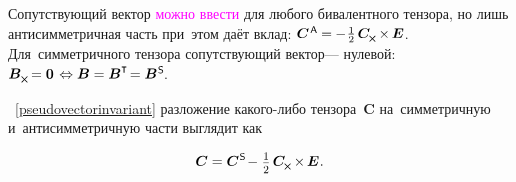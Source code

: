 \begin{otherlanguage}{russian}
\vspace{-0.6em}
Сопутствующий вектор \textcolor{magenta}{можно ввести} для любого бивалентного тензора, но лишь антисимметричная часть при~этом даёт вклад:
${\bm{C}^{\hspace{.2ex}\mathsf{A}} \hspace{-0.1ex} = \hspace{-0.1ex} - \hspace{.1ex}\onehalf\hspace{.32ex} \bm{C}_{\hspace{-0.1ex}\Xcompanion} \hspace{-0.16ex} \times \hspace{-0.16ex} \UnitDyad}$.
Для~симметричного тензора сопутствующий вектор\:--- нулевой:
${\bm{B}_{\Xcompanion} \hspace{-0.25ex} = \bm{0} \hspace{.25ex} \Leftrightarrow \bm{B} = \bm{B}^{\T} \hspace{-0.32ex} = \bm{B}^{\mathsf{\hspace{.1ex}S}}\hspace{-0.32ex}}$.

~\eqref{pseudovectorinvariant} разложение какого\hbox{-}либо тензора~$\bm{C}$ на~симметричную и~антисимметричную части выглядит как

\nopagebreak\vspace{-0.1em}\begin{equation}\label{symmetricantisymmetricdecompositionofsometensor}
\bm{C} = \bm{C}^{\mathsf{\hspace{.1ex}S}} \hspace{-0.32ex} - \hspace{.1ex} \smalldisplaystyleonehalf \hspace{.32ex} \bm{C}_{\hspace{-0.1ex}\Xcompanion} \hspace{-0.16ex} \times \hspace{-0.16ex} \UnitDyad
\hspace{.1ex} .
\end{equation}

\end{otherlanguage}

\vspace{-0.8em}\noindent
{} 

